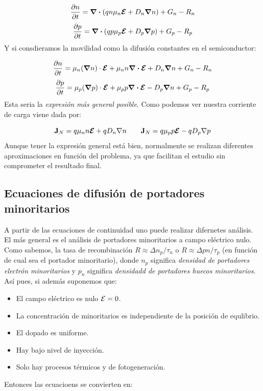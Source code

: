 \begin{equation}
	\frac{\partial n}{\partial t}=\div \left( qn\mu_n \boldsymbol{\mathcal{E}} +  D_n \grad n   \right) + G_n - R_n
\end{equation}
\begin{equation}
	\frac{\partial p}{\partial t} = \div \left( qp\mu_p \boldsymbol{\mathcal{E}} +  D_p \grad p   \right) + G_p - R_p
\end{equation}
Y si consdieramos la movilidad como la difusión constantes en el semiconductor:

\begin{equation}
	\frac{\partial n}{\partial t} = \mu_n (\grad n) \cdot \boldsymbol{\mathcal{E}} + \mu_n n \div \boldsymbol{\mathcal{E}} + D_n \grad n + G_n - R_n
\end{equation}
\begin{equation}
	\frac{\partial p}{\partial t} = \mu_p (\grad p) \cdot \boldsymbol{\mathcal{E}} + \mu_p p \div \boldsymbol{\mathcal{E}} - D_p \grad n + G_p - R_p
\end{equation}
Esta seria la \textit{expresión más general posible}. Como podemos ver nuestra corriente de carga viene dada por:

\begin{equation}
	\mathbf{J}_N = q \mu_n n \boldsymbol{\mathcal{E}} + q D_n \nabla n \qquad 
	\mathbf{J}_N = q \mu_p p  \boldsymbol{\mathcal{E}} - q D_p \nabla p
\end{equation}
Aunque tener la expresión general está bien, normalmente se realizan diferentes aproximaciones en función del problema, ya que facilitan el estudio sin comprometer el resultado final.

\subsection{Ecuaciones de difusión de portadores minoritarios}

A partir de las ecuaciones de continuidad uno puede realizar difernetes análisis. El más general es el análisis de portadores minoritarios a campo eléctrico nulo. Como sabemos, la tasa de recombinación $R\approx \Delta n_p/\tau_n$ o $R\approx \Delta pn / \tau_p$ (en función de cual sea el portador minoritario), donde $n_p$ significa \textit{densidad de portadores electrón minoritarios} y $p_n$ significa \textit{densidadd de portadores huecos minoritarios}. Así pues, si además suponemos que:

\begin{itemize}
	\item El campo eléctrico es nulo $\mathcal{E} = 0$. 
	\item La concentración de minoritarios es independiente de la posición de equlibrio.
	\item El dopado es uniforme.
	\item Hay bajo nivel de inyección.
	\item Solo hay procesos térmicos y de fotogeneración.
\end{itemize}
Entonces las ecuacioens se convierten en:

